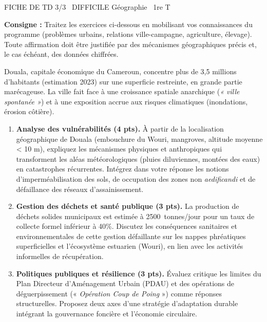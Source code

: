 \documentclass[11pt]{article}
\begin{document}
\begin{tcolorbox}[enhanced,colback=popink,colframe=popink,arc=10pt,boxrule=0pt,left=12pt,right=12pt,top=9pt,bottom=9pt]
{\color{white}\popxbold\small FICHE DE TD 3/3 \textbullet\ DIFFICILE \hfill Géographie \textbullet\ 1re T\par}
\end{tcolorbox}
\vspace{4pt}
\noindent\textbf{Consigne :} Traitez les exercices ci-dessous en mobilisant vos connaissances du programme (problèmes urbains, relations ville-campagne, agriculture, élevage). Toute affirmation doit être justifiée par des mécanismes géographiques précis et, le cas échéant, des données chiffrées.

\begin{exercice}
\label{exo:douala}
Douala, capitale économique du Cameroun, concentre plus de 3,5 millions d'habitants (estimation 2023) sur une superficie restreinte, en grande partie marécageuse. La ville fait face à une croissance spatiale anarchique (\textit{« ville spontanée »}) et à une exposition accrue aux risques climatiques (inondations, érosion côtière).
\begin{enumerate}
    \item \textbf{Analyse des vulnérabilités (4 pts).} À partir de la localisation géographique de Douala (embouchure du Wouri, mangroves, altitude moyenne < 10 m), expliquez les mécanismes physiques et anthropiques qui transforment les aléas météorologiques (pluies diluviennes, montées des eaux) en catastrophes récurrentes. Intégrez dans votre réponse les notions d'imperméabilisation des sols, de occupation des zones non \textit{aedificandi} et de défaillance des réseaux d'assainissement.
    \item \textbf{Gestion des déchets et santé publique (3 pts).} La production de déchets solides municipaux est estimée à \SI{2500}{tonnes/jour} pour un taux de collecte formel inférieur à 40\%. Discutez les conséquences sanitaires et environnementales de cette gestion défaillante sur les nappes phréatiques superficielles et l'écosystème estuarien (Wouri), en lien avec les activités informelles de récupération.
    \item \textbf{Politiques publiques et résilience (3 pts).} Évaluez critique les limites du Plan Directeur d'Aménagement Urbain (PDAU) et des opérations de déguerpissement (« \textit{Opération Coup de Poing} ») comme réponses structurelles. Proposez deux axes d'une stratégie d'adaptation durable intégrant la gouvernance foncière et l'économie circulaire.
\end{enumerate}
\end{exercice}
\end{document}
